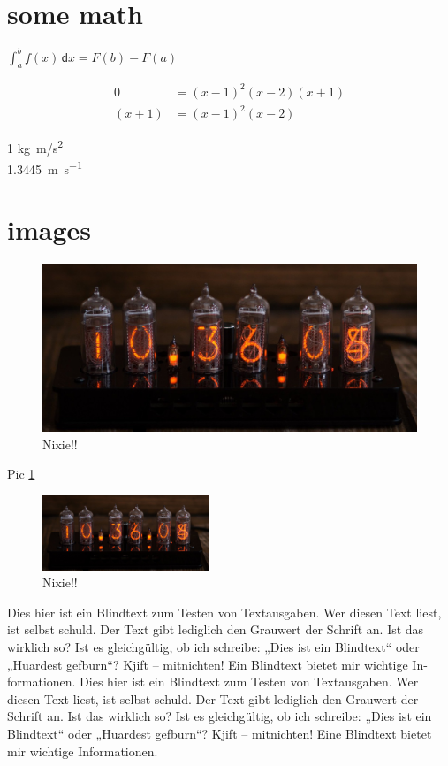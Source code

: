 \documentclass[a4paper]{scrartcl}
\begin{document}
	\tableofcontents
	\newpage
	\section{some math}
		$\int_{a}^{b} f(x) \,\mathsf{d}x=F(b)-F(a)$
		
		\begin{align}
			0&=(x-1)^2(x-2)(x+1) \\
			(x+1)&=(x-1)^2(x-2) 
		\end{align}
		
		\num{1} \si{kg.m/s^2}\\
		
		\SI[per-mode=fraction]{1.3445}{\meter\per\second}
		
	\section{images}
		\begin{figure}[hb]
			\centering
			\includegraphics[width=\textwidth]{img/nixie.jpg}
			\caption{Nixie!!}
			\label{fig:nixie}
		\end{figure}
	
		Pic \ref{fig:nixie}
	
		\begin{figure}
			\centering
			\includegraphics[width=5cm]{img/nixie.jpg}
			\caption{Nixie!!}
			\label{fig:nixie2}		
		\end{figure}
	
		Dies hier ist ein Blindtext zum Testen von Textausgaben. Wer diesen Text liest, ist selbst schuld. Der
		Text gibt lediglich den Grauwert der Schrift an. Ist das wirklich so? Ist es gleichgültig, ob ich schreibe:
		„Dies ist ein Blindtext“ oder „Huardest gefburn“? Kjift – mitnichten! Ein Blindtext bietet mir wichtige In-
		formationen. 		Dies hier ist ein Blindtext zum Testen von Textausgaben. Wer diesen Text liest, ist selbst schuld. Der
		Text gibt lediglich den Grauwert der Schrift an. Ist das wirklich so? Ist es gleichgültig, ob ich schreibe:
		„Dies ist ein Blindtext“ oder „Huardest gefburn“? Kjift – mitnichten! Eine Blindtext bietet mir wichtige Informationen.
		
\end{document}
